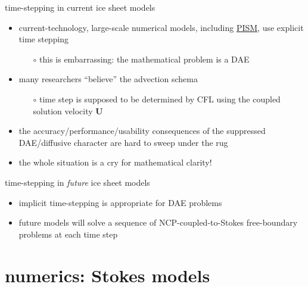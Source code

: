 \documentclass[svgnames,
               hyperref={colorlinks,citecolor=DeepPink4,linkcolor=FireBrick,urlcolor=Maroon},
               usepdftitle=false]  %
               {beamer}
\newcommand{\bU}{\mathbf{U}}
\begin{document}
\begin{frame}{time-stepping in current ice sheet models}

\begin{itemize}
\item current-technology, large-scale numerical models, including \href{https://www.pism.io/}{PISM}, use explicit time stepping
    \begin{itemize}
    \item[$\circ$] this is embarrassing: the mathematical problem is a DAE
    \end{itemize}
\item many researchers ``believe'' the advection schema
    \begin{itemize}
    \item[$\circ$] time step is supposed to be determined by CFL using the coupled solution velocity $\bU$
    \end{itemize}
\item the accuracy/performance/usability consequences of the suppressed DAE/diffusive character are hard to sweep under the rug
\item the whole situation is a cry for mathematical clarity!
\end{itemize}
\end{frame}


\begin{frame}{time-stepping in \emph{future} ice sheet models}

\begin{itemize}
\item \alert{implicit time-stepping} is appropriate for DAE problems
\item future models will solve a sequence of NCP-coupled-to-Stokes free-boundary problems at each time step
\end{itemize}
\end{frame}


\section{numerics: Stokes models}
\end{document}
